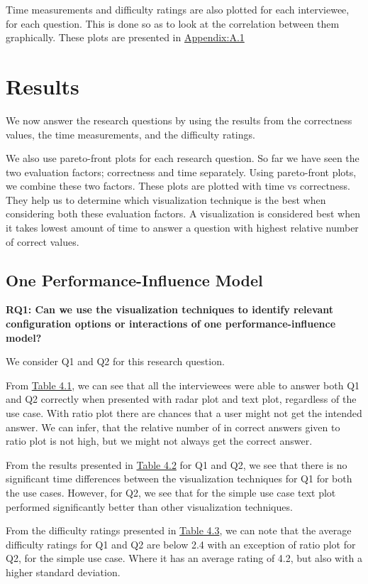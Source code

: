 Time measurements and difficulty ratings are also plotted for each interviewee, for each question. This is done so as to look at the correlation between them graphically. These plots are presented in \hyperref[sanityCheck]{Appendix:A.1}

\section{Results}
\label{sec:4.4}

We now answer the research questions by using the results from the correctness values, the time measurements, and the difficulty ratings.

We also use pareto-front plots for each research question. So far we have seen the two evaluation factors; correctness and time separately. Using pareto-front plots, we combine these two factors. These plots are plotted with time vs correctness. They help us to determine which visualization technique is the best when considering both these evaluation factors. A visualization is considered best when it takes lowest amount of time to answer a question with highest relative number of correct values.

\subsection*{One Performance-Influence Model}
\vskip 0.2in
\begin{mdframed}
\textbf{RQ1: Can we use the visualization techniques to identify relevant configuration options or interactions  of one performance-influence model?}
\end{mdframed}

We consider Q1 and Q2 for this research question.

\begin{description}[leftmargin=0pt]
\item[Correctness: ]From \hyperref[table:correctness]{Table 4.1}, we can see that all the interviewees were able to answer both Q1 and Q2 correctly when presented with radar plot and text plot, regardless of the use case. With ratio plot there are chances that a user might not get the intended answer. We can infer, that the relative number of in correct answers given to ratio plot is not high, but we might not always get the correct answer. 
  
\item[Time Measurements: ]From the results presented in \hyperref[table:time]{Table 4.2} for Q1 and Q2, we see that there is no significant time differences between the visualization techniques for Q1 for both the use cases. However, for Q2, we see that for the simple use case text plot performed significantly better than other visualization techniques.
  
\item[Difficulty Ratings: ]From the difficulty ratings presented in \hyperref[table:rating]{Table 4.3}, we can note that the average difficulty ratings for Q1 and Q2 are below 2.4 with an exception of ratio plot for Q2, for the simple use case. Where it has an average rating of 4.2, but also with a higher standard deviation.

\end{description}

